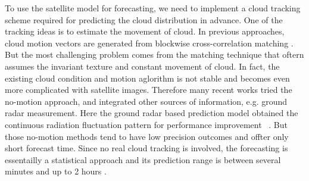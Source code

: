 \documentclass[conference]{IEEEtran}
\begin{document}
To use the satellite model for forecasting, we need to implement a cloud tracking scheme required for predicting the cloud distribution in advance. One of the tracking ideas
is to estimate the movement of cloud. In previous approaches, cloud motion vectors
are generated from blockwise cross-correlation matching
\cite{leese1970determination,heinemann2006forecasting}. But the most
challenging problem comes from the matching technique that oftern assumes the 
invariant texture and constant movement of cloud. In fact, the existing cloud
condition and motion aglorithm is not stable and  becomes even more complicated with satellite images.
Therefore many recent works tried  the no-motion approach, and integrated other sources of information, e.g.  ground radar measurement.  Here the ground radar based 
prediction model obtained the continuous radiation fluctuation pattern for performance improvement ~\cite{gorsdorf2011cloud}.  But those no-motion methods tend to have low precision outcomes and offter only short forecast time.  Since no real cloud tracking is involved, the
forecasting is essentailly a statistical approach and its prediction range is between several minutes and up to 2 hours \cite{yang2012hourly}. 
\end{document}

